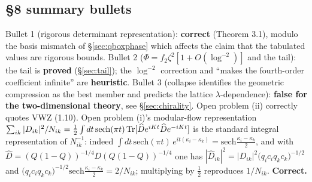 \documentclass[11pt]{article}
\begin{document}
\subsection{\S8 summary bullets}
Bullet 1 (rigorous determinant representation): \textbf{correct} (Theorem 3.1), modulo the basis
mismatch of \S\ref{sec:qboxphase} which affects the claim that the tabulated values are rigorous
bounds.  Bullet 2 ($\Phi=f_2\zeta^2[1+O(\log^{-2})]$ and the tail): the tail is \textbf{proved}
(\S\ref{sec:tail}); the $\log^{-2}$ correction and ``makes the fourth-order coefficient infinite''
are \textbf{heuristic}.  Bullet 3 (collapse identifies the geometric compression as the best
member and predicts the lattice $\lambda$-dependence): \textbf{false for the two-dimensional
theory}, see \S\ref{sec:chirality}.  Open problem (ii) correctly quotes VWZ (1.10).  Open problem
(i)'s modular-flow representation
$\sum_{ik}|D_{ik}|^2/N_{ik}=\tfrac12\int dt\,\mathrm{sech}(\pi t)\operatorname{Tr}[\widehat De^{iKt}\widehat De^{-iKt}]$
is the standard integral representation of $N_{ik}^{-1}$: indeed
$\int dt\,\mathrm{sech}(\pi t)\,e^{it(\kappa_i-\kappa_k)}=\mathrm{sech}\tfrac{\kappa_i-\kappa_k}2$,
and with $\widehat D=(Q(1-Q))^{-1/4}D(Q(1-Q))^{-1/4}$ one has
$|\widehat D_{ik}|^2=|D_{ik}|^2\bigl(q_ic_iq_kc_k\bigr)^{-1/2}$ and
$\bigl(q_ic_iq_kc_k\bigr)^{-1/2}\mathrm{sech}\frac{\kappa_i-\kappa_k}2=2/N_{ik}$; multiplying by
$\tfrac12$ reproduces $1/N_{ik}$.  \textbf{Correct.}
\end{document}

